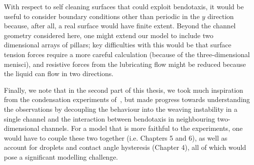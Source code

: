 With respect to self cleaning surfaces that could exploit bendotaxis, it would be useful to consider boundary conditions other than periodic in the $y$ direction because, after all, a real surface would have finite extent. Beyond the channel geometry considered here, one might extend our model to include two dimensional arrays of pillars; key difficulties with this would be that surface tension forces require a more careful calculation (because of the three-dimensional menisci), and resistive forces from the lubricating flow might be reduced because the liquid can flow in two directions.

Finally, we note that in the second part of this thesis, we took much inspiration from the condensation experiments of~\cite{Seemann2011JPhysCondMat}, but made progress towards understanding the observations by decoupling the behaviour into the weaving instability in a single channel and the interaction between bendotaxis in neighbouring two-dimensional channels. For a model that is more faithful to the experiments, one would have to couple these two together (i.e. Chapters 5 and 6), as well as account for droplets and contact angle hysteresis (Chapter 4), all of which would pose a significant modelling challenge.